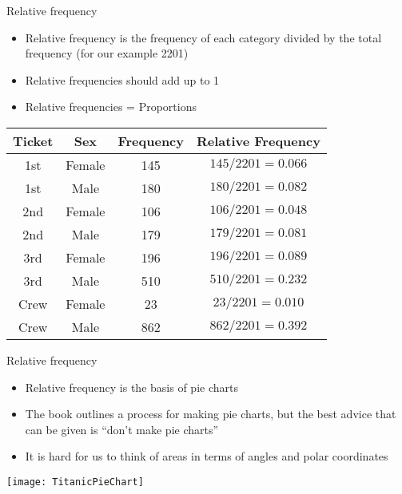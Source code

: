 \documentclass[xcolor=dvipsnames]{beamer}
\begin{document}
\begin{frame}{Relative frequency}
	\begin{itemize}
		\item Relative frequency is the frequency of each category divided by the total frequency (for our example 2201) \pause
		\item Relative frequencies should add up to 1 \pause
		\item Relative frequencies = Proportions \pause
	\end{itemize}
	\begin{center}
			\begin{tabular}{|c|c|c|c|}
			\hline
			\textbf{Ticket} & \textbf{Sex} & \textbf{Frequency} & \textbf{Relative Frequency}\\
			\hline \hline
			1st & Female & 145 & $145 / 2201 = 0.066$\\
			\hline
			1st &  Male & 180 & $180 / 2201 = 0.082$\\
			\hline
			2nd & Female & 106 & $106 / 2201 = 0.048$\\
			\hline
			2nd  & Male & 179 & $179 / 2201 = 0.081$\\
			\hline
			3rd & Female & 196 & $196 / 2201 = 0.089$\\
			\hline
			3rd  & Male & 510 & $510 / 2201 = 0.232$\\
			\hline
			Crew & Female &  23 & $23 / 2201 = 0.010$\\
			\hline
			Crew  & Male & 862 & $862 / 2201 = 0.392$\\
			\hline
		\end{tabular}
	\end{center}
\end{frame}

\begin{frame}{Relative frequency}
\begin{itemize}
	\item Relative frequency is the basis of pie charts \pause
	\item The book outlines a process for making pie charts, but the best advice that can be given is ``don't make pie charts'' \pause
	\item It is hard for us to think of areas in terms of angles and polar coordinates
\end{itemize}
\begin{center}
	\texttt{[image: TitanicPieChart]}
\end{center}
\end{frame}
\end{document}
